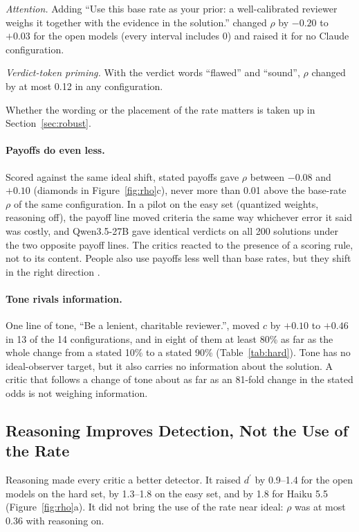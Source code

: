 \documentclass[letterpaper]{article} %
\newcommand{\dprime}{d^{\prime}}
\begin{document}
\emph{Attention.} Adding ``Use this base rate as your prior: a well-calibrated reviewer weighs it together with the evidence in the solution.'' changed $\rho$ by $-0.20$ to $+0.03$ for the open models (every interval includes 0) and raised it for no Claude configuration.

\emph{Verdict-token priming.} With the verdict words ``flawed'' and ``sound'', $\rho$ changed by at most 0.12 in any configuration.

Whether the wording or the placement of the rate matters is taken up in Section~\ref{sec:robust}.

\paragraph{Payoffs do even less.} Scored against the same ideal shift, stated payoffs gave $\rho$ between $-0.08$ and $+0.10$ (diamonds in Figure~\ref{fig:rho}c), never more than 0.01 above the base-rate $\rho$ of the same configuration. In a pilot on the easy set (quantized weights, reasoning off), the payoff line moved criteria the same way whichever error it said was costly, and Qwen3.5-27B gave identical verdicts on all 200 solutions under the two opposite payoff lines. The critics reacted to the presence of a scoring rule, not to its content. People also use payoffs less well than base rates, but they shift in the right direction \citep{bohil2001category,maddox2002toward}.

\paragraph{Tone rivals information.} One line of tone, ``Be a lenient, charitable reviewer.'', moved $c$ by $+0.10$ to $+0.46$ in 13 of the 14 configurations, and in eight of them at least 80\% as far as the whole change from a stated 10\% to a stated 90\% (Table~\ref{tab:hard}). Tone has no ideal-observer target, but it also carries no information about the solution. A critic that follows a change of tone about as far as an 81-fold change in the stated odds is not weighing information.

\subsection{Reasoning Improves Detection, Not the Use of the Rate}
\label{sec:reasoning}

Reasoning made every critic a better detector. It raised $\dprime$ by 0.9--1.4 for the open models on the hard set, by 1.3--1.8 on the easy set, and by 1.8 for Haiku 5.5 (Figure~\ref{fig:rho}a). It did not bring the use of the rate near ideal: $\rho$ was at most 0.36 with reasoning on.
\end{document}
